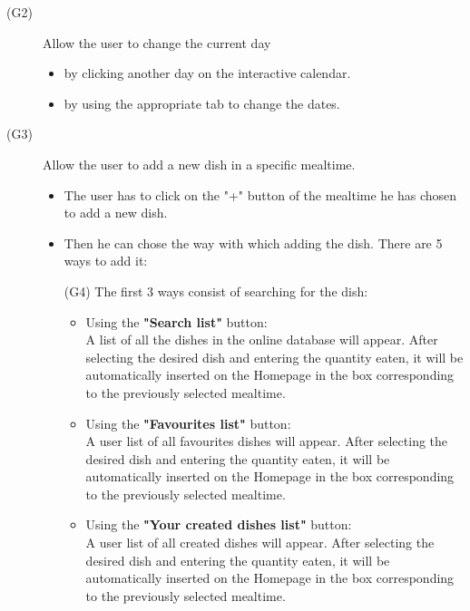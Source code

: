 \documentclass [12pt]{article}
\begin{document}
\begin{description}
\item[(G2)]Allow the user to change the current day
\begin{itemize}
\item  by clicking another day on the interactive calendar.
\item by using the appropriate tab to change the dates.
\end{itemize}
\end{description}

\begin{description}
\item[(G3)]Allow the user to add a new dish in a specific mealtime.
\begin{itemize}
\item The user has to click on the "+" button of the mealtime he has chosen to add a new dish.
\item  Then he can chose the way with which adding the dish. There are 5 ways to add it:\\
\item[(G4)] The first 3 ways consist of searching for the dish:
\begin{itemize}[•]
\item Using the \textbf{"Search list"} button:\\
A list of all the dishes in the online database will appear. After selecting the desired dish and entering the quantity eaten, it will be automatically inserted on the Homepage in the box corresponding to the previously selected mealtime.
\item Using the \textbf{"Favourites list"} button:\\
A user list of all favourites dishes will appear. After selecting the desired dish and entering the quantity eaten, it will be automatically inserted on the Homepage in the box corresponding to the previously selected mealtime. 
\item Using the \textbf{"Your created dishes list"} button:\\
A user list of all created dishes will appear. After selecting the desired dish and entering the quantity eaten, it will be automatically inserted on the Homepage in the box corresponding to the previously selected mealtime.
\end{itemize}


\end{itemize}
\end{description}
\end{document}

